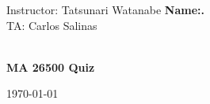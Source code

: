 \documentclass[12pt,letterpaper,addpoints]{exam}%
\begin{document}




\noindent Instructor: Tatsunari Watanabe
\hfill \textbf{Name:\underline{\phantom{My name way too long}}.}\\
\noindent TA: Carlos Salinas
\\\\
\begin{center}
  {\Large \textbf{MA 26500 \quad Quiz \examnum}}

  \bigskip

  \today
\end{center}

\end{document}
